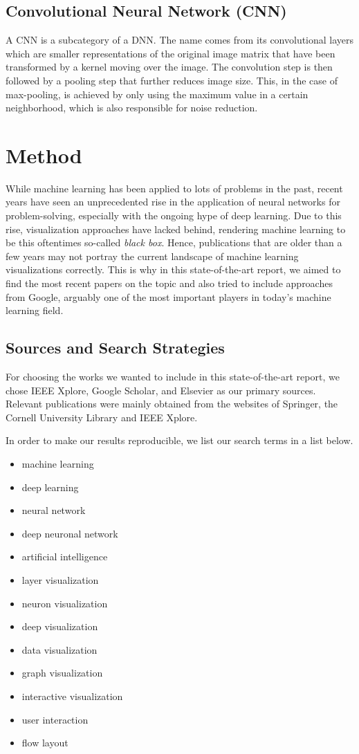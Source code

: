\documentclass{acmsiggraph}               %
\begin{document}
\subsection{Convolutional Neural Network (CNN)}
A CNN is a subcategory of a DNN. The name comes from its convolutional layers which are smaller representations of the original image matrix that have been transformed by a kernel moving over the image. The convolution step is then followed by a pooling step that further reduces image size. This, in the case of max-pooling, is achieved by only using the maximum value in a certain neighborhood, which is also responsible for noise reduction.

\section{Method}
While machine learning has been applied to lots of problems in the past, recent years have seen an unprecedented rise in the application of neural networks for problem-solving, especially with the ongoing hype of deep learning. Due to this rise, visualization approaches have lacked behind, rendering machine learning to be this oftentimes so-called \textit{black box}. Hence, publications that are older than a few years may not portray the current landscape of machine learning visualizations correctly. This is why in this state-of-the-art report, we aimed to find the most recent papers on the topic and also tried to include approaches from Google, arguably one of the most important players in today's machine learning field.

\subsection{Sources and Search Strategies}
For choosing the works we wanted to include in this state-of-the-art report, we chose IEEE Xplore, Google Scholar, and Elsevier as our primary sources. Relevant publications were mainly obtained from the websites of Springer, the Cornell University Library and IEEE Xplore.

In order to make our results reproducible, we list our search terms in a list below.

\begin{multicols}{2}
\begin{itemize}
\item machine learning
\item deep learning
\item neural network
\item deep neuronal network
\item artificial intelligence
\item layer visualization
\item neuron visualization
\item deep visualization
\item data visualization
\item graph visualization
\item interactive visualization
\item user interaction
\item flow layout
\end{itemize}
\end{multicols}
\end{document}
